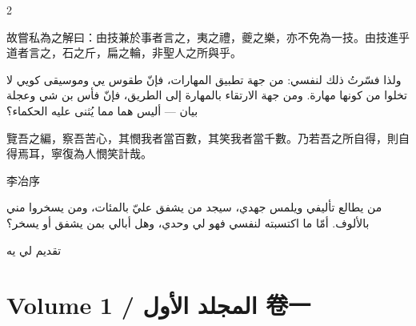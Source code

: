 \documentclass[11pt,a4paper]{article}
\newcommand{\ar}[1]{\arabicfont\beginR #1\endR}
\begin{document}
\begin{paracol}{2}
\switchcolumn*

{\color{prefacecolor}
故嘗私為之解曰：由技兼於事者言之，夷之禮，夔之樂，亦不免為一技。由技進乎道者言之，石之斤，扁之輪，非聖人之所與乎。
}

\switchcolumn

\ar{ولذا فسّرتُ ذلك لنفسي: من جهة تطبيق المهارات، فإنّ طقوس يي وموسيقى كويي لا تخلوا من كونها مهارة. ومن جهة الارتقاء بالمهارة إلى الطريق، فإنّ فأس بن شي وعجلة بيان — أليس هما مما يُثنى عليه الحكماء؟}

\switchcolumn*

{\color{prefacecolor}
覽吾之編，察吾苦心，其憫我者當百數，其笑我者當千數。乃若吾之所自得，則自得焉耳，寧復為人憫笑計哉。

\hfill 李冶序
}

\switchcolumn

\ar{من يطالع تأليفي ويلمس جهدي، سيجد من يشفق عليّ بالمئات، ومن يسخروا مني بالألوف. أمّا ما اكتسبته لنفسي فهو لي وحدي، وهل أبالي بمن يشفق أو يسخر؟}

\vspace{0.3cm}

\ar{\hfill تقديم لي يه}

\end{paracol}

\newpage


\section{Volume 1 / \ar{المجلد الأول} \quad 卷一}
\label{sec:vol1}
\end{document}

